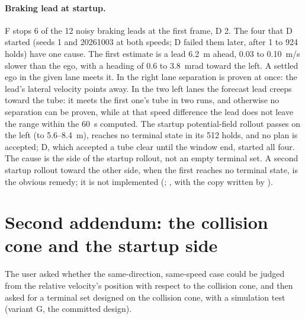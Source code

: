 \documentclass[11pt]{article}
\begin{document}
\paragraph{Braking lead at startup.} F stops 6 of the 12 noisy braking leads
at the first frame, D 2. The four that D started (seeds 1 and 20261003 at
both speeds; D failed them later, after 1 to 924 holds) have one cause. The
first estimate is a lead 6.2~m ahead, 0.03 to 0.10~m/s slower than the ego,
with a heading of 0.6 to 3.8~mrad toward the left. A settled ego in the given
lane meets it. In the right lane separation is proven at once: the lead's
lateral velocity points away. In the two left lanes the forecast lead creeps
toward the tube: it meets the first one's tube in two runs, and otherwise no
separation can be proven, while at that speed difference the lead does not
leave the range within the 60~s computed. The startup potential-field rollout
passes on the left (to 5.6--8.4~m), reaches no terminal state in its 512 holds,
and no plan is accepted; D, which accepted a tube clear until the window end,
started all four. The cause is the side of the startup rollout, not an empty
terminal set. A second startup rollout toward the other side, when the first
reaches no terminal state, is the obvious remedy; it is not implemented
(; ,
 with the copy written by
).

\section{Second addendum: the collision cone and the startup side}
The user asked whether the same-direction, same-speed case could be judged
from the relative velocity's position with respect to the collision cone, and
then asked for a terminal set designed on the collision cone, with a
simulation test (variant G, the committed design).
\end{document}
